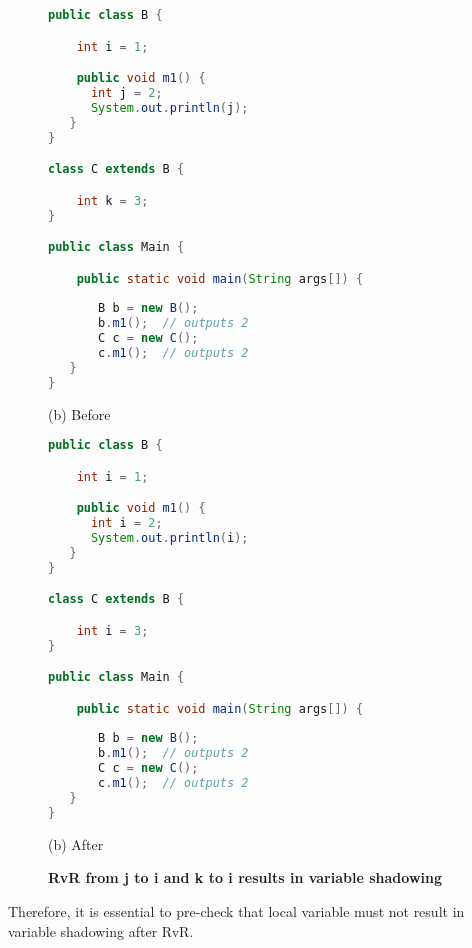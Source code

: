 \begin{figure}[th]
\centering
\begin{minipage}[t]{0.8\linewidth}
\begin{lstlisting}[language=java, basicstyle=\scriptsize\ttfamily,frame=single]
public class B {

    int i = 1;

    public void m1() {
      int j = 2;
      System.out.println(j);
   }
}

class C extends B {

    int k = 3;
}

public class Main {

    public static void main(String args[]) {
  
       B b = new B();
       b.m1(); 	// outputs 2
       C c = new C();
       c.m1(); 	// outputs 2
   }
}
\end{lstlisting}
\centering(b) Before 
\end{minipage}
\hfill
\begin{minipage}[t]{0.8\linewidth}
\begin{lstlisting}[language=java, basicstyle=\scriptsize\ttfamily,frame=single]
public class B {

    int i = 1;

    public void m1() {
      int i = 2;
      System.out.println(i);
   }
}

class C extends B {

    int i = 3;
}

public class Main {

    public static void main(String args[]) {
  
       B b = new B();
       b.m1(); 	// outputs 2
       C c = new C();
       c.m1(); 	// outputs 2
   }
}
\end{lstlisting}
\centering(b) After 
\end{minipage}
\caption{\textbf{RvR from j to i  and k to i results in variable shadowing}}
\label{figure:precond5_4}
\end{figure}


Therefore, it is essential to pre-check that local variable must not result in variable shadowing after RvR.